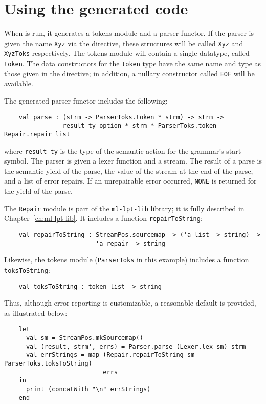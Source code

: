 
\section{Using the generated code}\label{sec:antlr-gencode}

When \antlr{} is run, it generates a tokens module and a parser functor.  If the parser is given the name {\tt Xyz} via the  directive, these structures will be called {\tt Xyz} and {\tt XyzToks} respectively.  The tokens module will contain a single datatype, called {\tt token}.  The data constructors for the {\tt token} type have the same name and type as those given in the  directive; in addition, a nullary constructor called {\tt EOF} will be available.

The generated parser functor includes the following:
\begin{verbatim}
    val parse : (strm -> ParserToks.token * strm) -> strm -> 
                result_ty option * strm * ParserToks.token Repair.repair list
\end{verbatim}
where {\tt result\_ty} is the type of the semantic action for the grammar's start symbol.  
The parser is given a lexer function and a stream.
The result of a parse is the semantic yield of the parse, the value of the stream at the end of the parse, and a list of error repairs.  
If an unrepairable error occurred, {\tt NONE} is returned for the yield of the parse.

The {\tt Repair} module is part of the {\tt ml-lpt-lib} library; it is fully described in Chapter~\ref{ch:ml-lpt-lib}.  It includes a function {\tt repairToString}:
\begin{verbatim}
    val repairToString : StreamPos.sourcemap -> ('a list -> string) ->
                         'a repair -> string
\end{verbatim}
Likewise, the tokens module ({\tt ParserToks} in this example) includes a function {\tt toksToString}:
\begin{verbatim}
    val toksToString : token list -> string
\end{verbatim}
Thus, although error reporting is customizable, a reasonable default is provided, as illustrated below:
\begin{verbatim}
    let
      val sm = StreamPos.mkSourcemap()
      val (result, strm', errs) = Parser.parse (Lexer.lex sm) strm
      val errStrings = map (Repair.repairToString sm ParserToks.toksToString)
                           errs
    in
      print (concatWith "\n" errStrings)
    end
\end{verbatim}